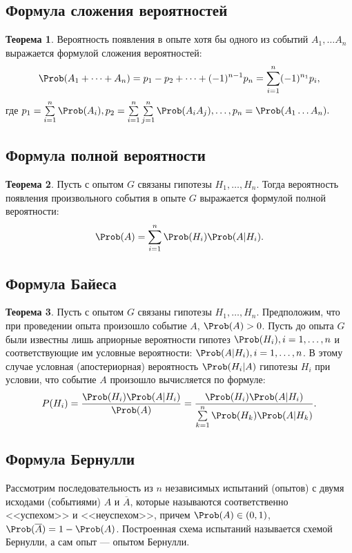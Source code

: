 \documentclass[12pt]{report}
\theoremstyle{definition}
\newtheorem{theorem}{Теорема}[chapter]
\begin{document}
\subsection{Формула сложения вероятностей}
\begin{theorem}
Вероятность появления в опыте хотя бы одного из событий $A_1, \dots A_n$
выражается формулой сложения вероятностей:
$$
\Prob(A_1 + \dots + A_n) = p_1 - p_2 + \dots + (-1)^{n-1} p_n
= \sum\limits_{i=1}^n (-1)^{n_1} p_i,
$$
где 
$p_1 = \sum\limits_{i=1}^n \Prob(A_i),
p_2 = \sum\limits_{i=1}^n\sum\limits_{j=1}^n \Prob(A_i A_j),
\dots,
p_n = \Prob(A_1 \dots A_n).
$
\end{theorem}

\subsection{Формула полной вероятности}
\begin{theorem}
Пусть с опытом $G$ связаны гипотезы $H_1, \dots, H_n$.
Тогда вероятность появления произвольного события в опыте $G$
выражается формулой полной вероятности:
$$
\Prob(A) = \sum\limits_{i=1}^n \Prob(H_i) \Prob(A|H_i).
$$
\end{theorem}

\subsection{Формула Байеса}
\begin{theorem}
Пусть с опытом $G$ связаны гипотезы $H_1, \dots, H_n$. Предположим,
что при проведении опыта произошло событие $A$, $\Prob(A) > 0$. Пусть 
до опыта $G$ были известны лишь априорные вероятности гипотез
$\Prob(H_i), i =1, \dots, n$ и соответствующие им условные вероятности:
$\Prob(A|H_i), i =1, \dots, n$. В этому случае условная (апостериорная)
вероятность $\Prob(H_i|A)$ гипотезы $H_i$ при условии, что событие $A$ произошло
вычисляется по формуле:
$$
P(H_i) = \dfrac{\Prob(H_i) \Prob(A|H_i)}{\Prob(A)}
= \dfrac{\Prob(H_i) \Prob(A|H_i)}{\sum\limits_{k=1}^n \Prob(H_k) \Prob(A|H_k)}.
$$
\end{theorem}


\subsection{Формула Бернулли}
Рассмотрим последовательность из $n$ независимых испытаний
(опытов) с двумя исходами (событиями) $A$ и $\overline{A}$, которые
называются соответственно <<успехом>> и <<неуспехом>>,
причем $\Prob(A) \in (0, 1)$, $\Prob(\overline{A}) = 1 - \Prob(A)$.
Построенная схема испытаний называется схемой Бернулли,
а сам опыт --- опытом Бернулли. 
\end{document}
